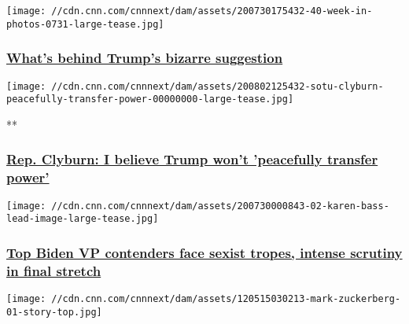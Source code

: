\texttt{[image: //cdn.cnn.com/cnnnext/dam/assets/200730175432-40-week-in-photos-0731-large-tease.jpg]}

\hypertarget{whats-behind-trumps-bizarre-suggestion}{%
\subsubsection{\texorpdfstring{\href{/2020/08/02/opinions/trump-bizarre-suggestion-opinion-column-galant/index.html}{What's
behind Trump's bizarre
suggestion}}{What's behind Trump's bizarre suggestion}}\label{whats-behind-trumps-bizarre-suggestion}}

\href{/videos/politics/2020/08/02/sotu-clyburn-peacefully-transfer-power.cnn}{}

\texttt{[image: //cdn.cnn.com/cnnnext/dam/assets/200802125432-sotu-clyburn-peacefully-transfer-power-00000000-large-tease.jpg]}

**

\hypertarget{rep-clyburn-i-believe-trump-wont-peacefully-transfer-power}{%
\subsubsection{\texorpdfstring{\href{/videos/politics/2020/08/02/sotu-clyburn-peacefully-transfer-power.cnn}{Rep.
Clyburn: I believe Trump won't 'peacefully transfer
power'}}{Rep. Clyburn: I believe Trump won't 'peacefully transfer power'}}\label{rep-clyburn-i-believe-trump-wont-peacefully-transfer-power}}

\href{/2020/08/02/politics/joe-biden-vice-presidential-running-mate/index.html}{}

\texttt{[image: //cdn.cnn.com/cnnnext/dam/assets/200730000843-02-karen-bass-lead-image-large-tease.jpg]}

\hypertarget{top-biden-vp-contenders-face-sexist-tropes-intense-scrutiny-in-final-stretch}{%
\subsubsection{\texorpdfstring{\href{/2020/08/02/politics/joe-biden-vice-presidential-running-mate/index.html}{Top
Biden VP contenders face sexist tropes, intense scrutiny in final
stretch}}{Top Biden VP contenders face sexist tropes, intense scrutiny in final stretch}}\label{top-biden-vp-contenders-face-sexist-tropes-intense-scrutiny-in-final-stretch}}

\href{/2014/02/11/world/facebook-fast-facts/index.html}{}

\texttt{[image: //cdn.cnn.com/cnnnext/dam/assets/120515030213-mark-zuckerberg-01-story-top.jpg]}

